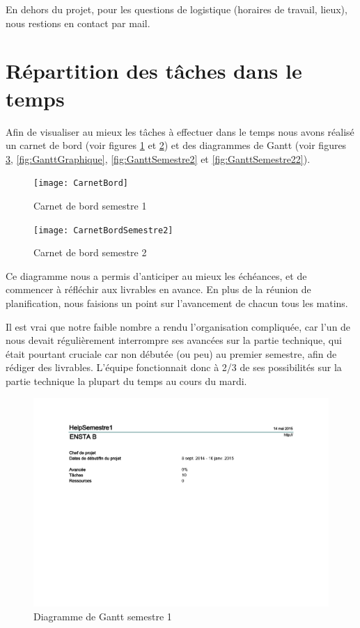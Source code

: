 En dehors du projet, pour les questions de logistique (horaires de travail, lieux), nous restions en contact par mail. 

\section{Répartition des tâches dans le temps}

Afin de visualiser au mieux les tâches à effectuer dans le temps nous avons réalisé un carnet de bord (voir figures \ref{fig:CarnetBord} et \ref{fig:CarnetBordS2}) et des diagrammes de Gantt (voir figures \ref{fig:Gantt}, \ref{fig:GanttGraphique}, \ref{fig:GanttSemestre2} et \ref{fig:GanttSemestre22}).
 
\begin{figure}[H]
  \centering
  \texttt{[image: CarnetBord]}
  \caption{Carnet de bord semestre 1}
  \label{fig:CarnetBord}
\end{figure}

\begin{figure}[H]
  \centering
  \texttt{[image: CarnetBordSemestre2]}
  \caption{Carnet de bord semestre 2}
  \label{fig:CarnetBordS2}
\end{figure}
 
Ce diagramme nous a permis d’anticiper au mieux les échéances, et de commencer à réfléchir aux livrables en avance. En plus de la réunion de planification, nous faisions un point sur l’avancement de chacun tous les matins.

Il est vrai que notre faible nombre a rendu l’organisation compliquée, car l’un de nous devait régulièrement interrompre ses avancées sur la partie technique, qui était pourtant cruciale car non débutée (ou peu) au premier semestre, afin de rédiger des livrables. L’équipe fonctionnait donc à 2/3 de ses possibilités sur la partie technique la plupart du temps au cours du mardi.
 
\begin{figure}[H]
  \centering
  \includegraphics[scale=1]{GanttSemestre1}
  \caption{Diagramme de Gantt semestre 1}
  \label{fig:Gantt}
\end{figure}

